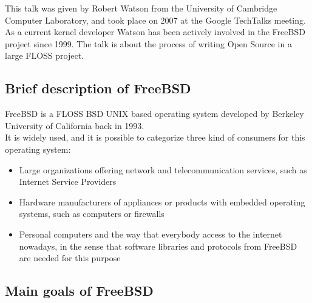 \documentclass[11pt]{article} %
\begin{document}
This talk was given by Robert Watson from the University of Cambridge Computer Laboratory, and took place on 2007 at the Google TechTalks meeting. As a current kernel developer Watson has been actively involved in the FreeBSD project since 1999. The talk is about the process of writing Open Source in a large FLOSS project.


\subsection{Brief description of FreeBSD}

FreeBSD is a FLOSS BSD UNIX based operating system developed by Berkeley University of California back in 1993.\\

It is widely used, and it is possible to categorize three kind of consumers for this operating system:

\begin{itemize}
  \item Large organizations offering network and telecommunication services, such as Internet Service Providers
  \item Hardware manufacturers of appliances or products with embedded operating systems, such as computers or firewalls
  \item Personal computers and the way that everybody access to the internet nowadays, in the sense that software libraries and protocols from FreeBSD are needed for this purpose
\end{itemize}


\subsection{Main goals of FreeBSD}
\end{document}
